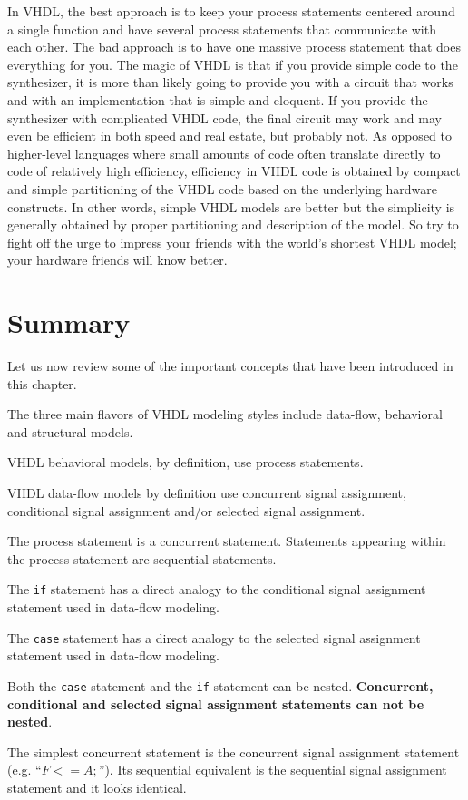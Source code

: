 In VHDL, the best approach is to keep your process statements centered around a single function and have several process statements that communicate with each other. The bad approach is to have one massive process statement that does everything for you. The magic of VHDL is that if you provide simple code to the synthesizer, it is more than likely going to provide you with a circuit that works and with an implementation that is simple and eloquent. If you provide the synthesizer with complicated VHDL code, the final circuit may work and may even be efficient in both speed and real estate, but probably not. As opposed to higher-level languages where small amounts of code often translate directly to code of relatively high efficiency, efficiency in VHDL code is obtained by compact and simple partitioning of the VHDL code based on the underlying hardware constructs. In other words, simple VHDL models are better but the simplicity is generally obtained by proper partitioning and description of the model. So try to fight off the urge to impress your friends with the world's shortest VHDL model; your hardware friends will know better.
\section{Summary}
Let us now review some of the important concepts that have been introduced in this chapter.
\begin{my_list}
\item The three main flavors of VHDL modeling styles include data-flow, behavioral and structural models.
\item VHDL behavioral models, by definition, use process statements.
\item VHDL data-flow models by definition use concurrent signal assignment, conditional signal assignment and/or selected signal assignment.
\item The process statement is a concurrent statement. Statements appearing within the process statement are sequential statements.
\item The \texttt{if} statement has a direct analogy to the conditional signal assignment statement used in data-flow modeling.
\item The \texttt{case} statement has a direct analogy to the selected signal assignment statement used in data-flow modeling.
\item Both the \texttt{case} statement and the \texttt{if} statement can be nested. \textbf{Concurrent, conditional and selected signal assignment statements can not be nested}.
\item The simplest concurrent statement is the concurrent signal assignment statement (e.g. ``{\footnotesize$F <= A;$}''). Its sequential equivalent is the sequential signal assignment statement and it looks identical.
\end{my_list}

